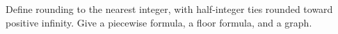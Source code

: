 Define rounding to the nearest integer, with half-integer ties rounded toward positive infinity. Give a piecewise formula, a floor formula, and a graph.
